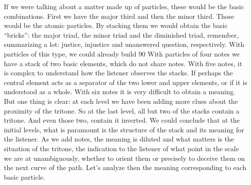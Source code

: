 \documentclass[]{report}
\begin{document}
If we were talking about a matter made up of particles, these would be the basic combinations. First we have the major third and then the minor third. Those would be the atomic particles. By stacking them we would obtain the basic ``bricks'': the major triad, the minor triad and the diminished triad, remember, summarizing a lot: justice, injustice and unanswered question, respectively. With particles of this type, we could already build 90%
With particles of four notes we have a stack of two basic elements, which do not share notes.
With five notes, it is complex to understand how the listener observes the stacks. If perhaps the central element acts as a separator of the two lower and upper elements, or if it is understood as a whole.
With six notes it is very difficult to obtain a meaning.
But one thing is clear: at each level we have been adding more clues about the proximity of the tritone. So at the last level, all but two of the stacks contain a tritone. And even those two, contain it inverted.
We could conclude that at the initial levels, what is paramount is the structure of the stack and its meaning for the listener. As we add notes, the meaning is diluted and what matters is the situation of the tritone, the indication to the listener of what point in the scale we are at unambiguously, whether to orient them or precisely to deceive them on the next curve of the path.
Let's analyze then the meaning corresponding to each basic particle.
\end{document}
